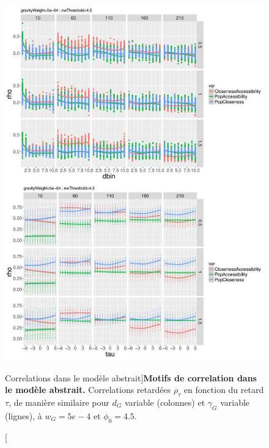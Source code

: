\begin{figure}
	\includegraphics[width=\linewidth,height=0.8\textheight]{Figures/Final/6-2-2-fig-macrocoevol-correlations.jpg}
\caption[Correlations in the abstract model][Correlations dans le modèle abstrait]{}{\textbf{Motifs de correlation dans le modèle abstrait.} Correlations retardées $\rho_{\tau}$ en fonction du retard $\tau$, de manière similaire pour $d_G$ variable (colonnes) et $\gamma_G$ variable (lignes), à $w_G = 5e-4$ et $\phi_0 = 4.5$. \label{fig:macrocoevol:correlations}}
\end{figure}



